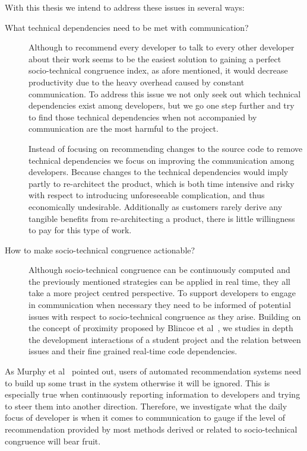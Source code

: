 With this thesis we intend to address these issues in several ways:
\begin{description}
\item[What technical dependencies need to be met with communication?] 
Although to recommend every developer to talk to every other developer about their work seems to be the easiest solution to gaining a perfect socio-technical congruence index, as afore mentioned, it would decrease productivity due to the heavy overhead caused by  constant communication.
To address this issue we not only seek out which technical dependencies exist among developers, but we go one step further and try to find those technical dependencies when not accompanied by communication are the most harmful to the project.

Instead of focusing on recommending changes to the source code to remove technical dependencies we focus on improving the communication among developers.
Because changes to the technical dependencies would imply partly to re-architect the product, which is both time intensive and risky with respect to introducing unforeseeable complication, and thus economically undesirable.
Additionally as customers rarely derive any tangible benefits from re-architecting a product, there is little willingness to pay for this type of work.

\item[How to make socio-technical congruence actionable?] Although socio-technical congruence can be continuously computed and the previously mentioned strategies can be applied in real time, they all take a more project centred perspective.
To support developers to engage in communication when necessary they need to be informed of potential issues with respect to socio-technical congruence as they arise.
Building on the concept of proximity proposed by Blincoe et al~\cite{blincoe:cscw:2012}, we studies in depth the development interactions of a student project and the relation between issues and their fine grained real-time code dependencies.

\end{description}

As Murphy et al~\cite{murphy:rsse:2010} pointed out, users of automated recommendation systems need to build up some trust in the system otherwise it will be ignored.
This is especially true when continuously reporting information to developers and trying to steer them into another direction.
Therefore, we investigate what the daily focus of developer is when it comes to communication to gauge if the level of recommendation provided by most methods derived or related to socio-technical congruence will bear fruit.

